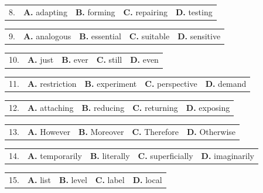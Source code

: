 \documentclass[UTF8,11pt]{ctexart}
\begin{document}
\noindent\begin{tabularx}{\linewidth}{@{}lXXXX@{}}8. & \textbf{A.} adapting & \textbf{B.} forming & \textbf{C.} repairing & \textbf{D.} testing\\\end{tabularx}\par

\noindent\begin{tabularx}{\linewidth}{@{}lXXXX@{}}9. & \textbf{A.} analogous & \textbf{B.} essential & \textbf{C.} suitable & \textbf{D.} sensitive\\\end{tabularx}\par

\noindent\begin{tabularx}{\linewidth}{@{}lXXXX@{}}10. & \textbf{A.} just & \textbf{B.} ever & \textbf{C.} still & \textbf{D.} even\\\end{tabularx}\par

\noindent\begin{tabularx}{\linewidth}{@{}lXXXX@{}}11. & \textbf{A.} restriction & \textbf{B.} experiment & \textbf{C.} perspective & \textbf{D.} demand\\\end{tabularx}\par

\noindent\begin{tabularx}{\linewidth}{@{}lXXXX@{}}12. & \textbf{A.} attaching & \textbf{B.} reducing & \textbf{C.} returning & \textbf{D.} exposing\\\end{tabularx}\par

\noindent\begin{tabularx}{\linewidth}{@{}lXXXX@{}}13. & \textbf{A.} However & \textbf{B.} Moreover & \textbf{C.} Therefore & \textbf{D.} Otherwise\\\end{tabularx}\par

\noindent\begin{tabularx}{\linewidth}{@{}lXXXX@{}}14. & \textbf{A.} temporarily & \textbf{B.} literally & \textbf{C.} superficially & \textbf{D.} imaginarily\\\end{tabularx}\par

\noindent\begin{tabularx}{\linewidth}{@{}lXXXX@{}}15. & \textbf{A.} list & \textbf{B.} level & \textbf{C.} label & \textbf{D.} local\\\end{tabularx}\par
\end{document}
